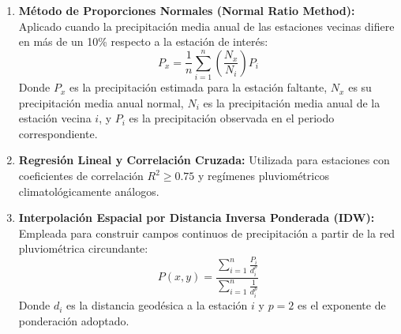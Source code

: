 \documentclass[11pt,a4paper]{article}
\begin{document}
\begin{enumerate}
\item \textbf{Método de Proporciones Normales (Normal Ratio Method):} Aplicado cuando la precipitación media anual de las estaciones vecinas difiere en más de un 10\% respecto a la estación de interés:
\begin{equation}
P_x = \frac{1}{n} \sum_{i=1}^{n} \left( \frac{N_x}{N_i} \right) P_i
\end{equation}
Donde $P_x$ es la precipitación estimada para la estación faltante, $N_x$ es su precipitación media anual normal, $N_i$ es la precipitación media anual de la estación vecina $i$, y $P_i$ es la precipitación observada en el periodo correspondiente.

\item \textbf{Regresión Lineal y Correlación Cruzada:} Utilizada para estaciones con coeficientes de correlación $R^2 \ge 0.75$ y regímenes pluviométricos climatológicamente análogos.

\item \textbf{Interpolación Espacial por Distancia Inversa Ponderada (IDW):} Empleada para construir campos continuos de precipitación a partir de la red pluviométrica circundante:
\begin{equation}
P(x, y) = \frac{\sum_{i=1}^{n} \frac{P_i}{d_i^p}}{\sum_{i=1}^{n} \frac{1}{d_i^p}}
\end{equation}
Donde $d_i$ es la distancia geodésica a la estación $i$ y $p=2$ es el exponente de ponderación adoptado.
\end{enumerate}
\end{document}
